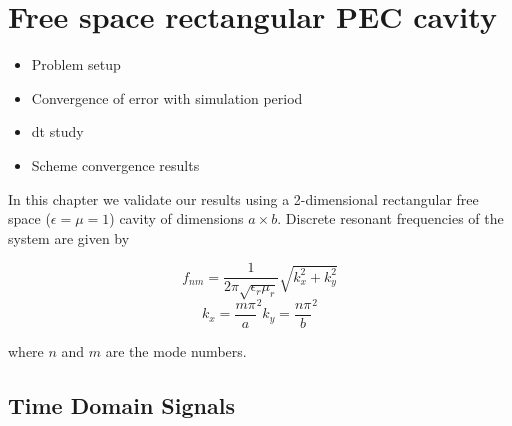 
%
%
%
% 


\label{Chapter3}
\chapter{Free space rectangular PEC cavity} %

\begin{itemize}
  \item Problem setup
  \item Convergence of error with simulation period
  \item dt study
  \item Scheme convergence results
\end{itemize}

In this chapter we validate our results using a 2-dimensional rectangular free space ($\epsilon=\mu=1$) cavity of dimensions $a \times b$. Discrete resonant frequencies of the system are given by

$$
f_{nm} = \frac{1}{2 \pi \sqrt{\epsilon_r \mu_r}} \sqrt{ k_x^2 + k_y^2 }
$$
$$
k_{x} = \frac{m \pi}{a}^2
k_{y} = \frac{n \pi}{b}^2
$$

where $n$ and $m$ are the mode numbers.

\section{Time Domain Signals}

